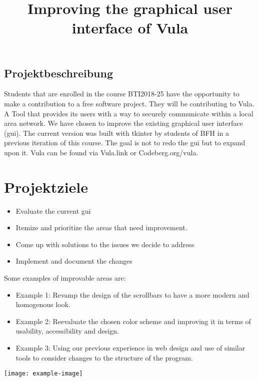 \documentclass[
	trilingual,
	type=projectproposal,
	twocolumn
]{bfhpub}
\begin{document}
 
\title{Improving the graphical user interface of Vula}
\subject{Das ist ein Teaser auf dem Titelblatt. Making secure communication more accessible by improving the user experience.}
 
 
 
%
 
 
\begin{ProjectDescription}
  \section{Projektbeschreibung}
  Students that are enrolled in the course BTI2018-25 have the opportunity to make a contribution to a free software project. They will be contributing to Vula. A Tool that provides its users with a way to securely communicate within a local area network. We have chosen to improve the existing graphical user interface (gui). The current version was built with tkinter by students of BFH in a previous iteration of this course. The goal is not to redo the gui but to expand upon it. Vula can be found via Vula.link or Codeberg.org/vula.
\end{ProjectDescription}
 
\maketitle
 
\section{Projektziele}
\begin{itemize}
  \item Evaluate the current gui
  \item Itemize and prioritize the areas that need improvement.
  \item Come up with solutions to the issues we decide to address
  \item Implement and document the changes
\end{itemize}
Some examples of improvable areas are:
\begin{itemize}
  \item Example 1: Revamp the design of the scrollbars to have a more modern and homogenous look.
  \item Example 2: Reevaluate the chosen color scheme and improving it in terms of usability, accessibility and design.
  \item Example 3: Using our previous experience in web design and use of similar tools to consider changes to the structure of the program.
\end{itemize}
\vfill
\texttt{[image: example-image]}
\par\nointerlineskip\bfhRule
 
\end{document}
